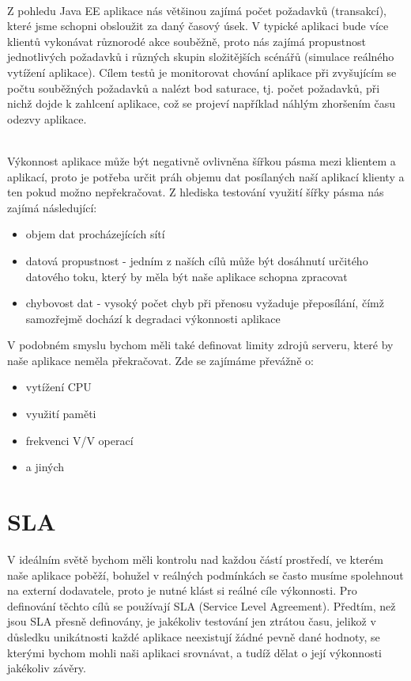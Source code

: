 \documentclass[122pt,oneside]{fithesis}
\begin{document}
\vspace{5 mm}
\\\indent Z pohledu Java EE aplikace nás většinou zajímá počet požadavků (transakcí), které jsme schopni obsloužit za daný časový úsek. V typické aplikaci bude více klientů vykonávat různorodé akce souběžně, proto nás zajímá propustnost jednotlivých požadavků i různých skupin složitějších scénářů (simulace reálného vytížení aplikace). Cílem testů je monitorovat chování aplikace při zvyšujícím se počtu souběžných požadavků a nalézt bod saturace, tj. počet požadavků, při nichž dojde k zahlcení aplikace, což se projeví například náhlým zhoršením času odezvy aplikace. 

\vspace{5 mm}
\\\indent Výkonnost aplikace může být negativně ovlivněna šířkou pásma mezi klientem a aplikací, proto je potřeba určit práh objemu dat posílaných naší aplikací klienty a ten pokud možno nepřekračovat. Z hlediska testování využití šířky pásma nás zajímá následující:
\begin{itemize}
  \item objem dat procházejících sítí
  \item datová propustnost - jedním z naších cílů může být dosáhnutí určitého datového toku, který by měla být naše aplikace schopna zpracovat
  \item chybovost dat - vysoký počet chyb při přenosu vyžaduje přeposílání, čímž samozřejmě dochází k degradaci výkonnosti aplikace
\end{itemize}
V podobném smyslu bychom měli také definovat limity zdrojů serveru, které by naše aplikace neměla překračovat. Zde se zajímáme převážně o:
\begin{itemize}
  \item vytížení CPU
  \item využití paměti
  \item frekvenci V/V operací
  \item a jiných
\end{itemize}

\section{SLA}
V ideálním světě bychom měli kontrolu nad každou částí prostředí, ve kterém naše aplikace poběží, bohužel v reálných podmínkách se často musíme spolehnout na externí dodavatele, proto je nutné klást si reálné cíle výkonnosti. Pro definování těchto cílů se používají SLA (Service Level Agreement). Předtím, než jsou SLA přesně definovány, je jakékoliv testování jen ztrátou času, jelikož v důsledku unikátnosti každé aplikace neexistují žádné pevně dané hodnoty, se kterými bychom mohli naši aplikaci srovnávat, a tudíž dělat o její výkonnosti jakékoliv závěry.
\end{document}
